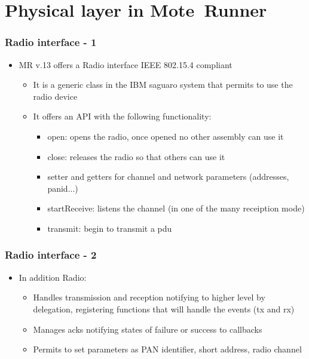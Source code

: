 \section{Physical layer in \mbox{Mote Runner}}
\begin{frame}[fragile]
  \frametitle{Radio interface - 1}
  \begin{itemize}
    \item MR v.13 offers a Radio interface IEEE 802.15.4 compliant
    \begin{itemize}
    	\item It is a generic class in the IBM saguaro system that permits to use the radio device
    	\item It offers an API with the following functionality:
    	\begin{itemize}
			\item open: opens the radio, once opened no other assembly can use it
			\item close: releases the radio so that others can use it
			\item setter and getters for channel and network parameters (addresses, panid...)
			\item startReceive: listens the channel (in one of the many receiption mode)
			\item transmit: begin to transmit a pdu
    	\end{itemize}
    \end{itemize}
  \end{itemize}
\end{frame}

\begin{frame}[fragile]
	\frametitle{Radio interface - 2}
	\begin{itemize}
		\item In addition Radio:
		\begin{itemize}
			\item Handles transmission and reception notifying to higher level by delegation, registering functions that will handle the events (tx and rx)
			\item Manages acks notifying states of failure or success to callbacks
			\item Permits to set parameters as PAN identifier, short address, radio channel
		\end{itemize}
	\end{itemize}
\end{frame}


